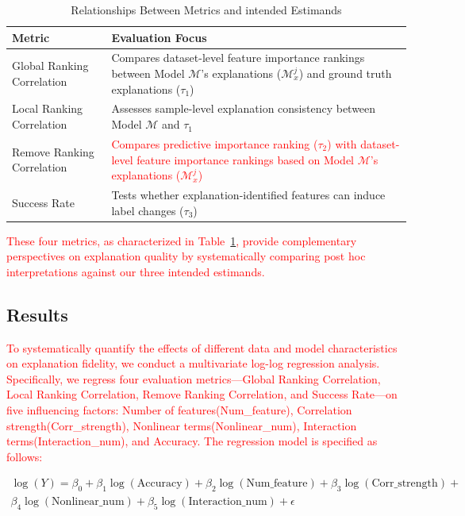 \begin{table}[htbp]
\centering
\caption{Relationships Between Metrics and intended Estimands}
\label{tab:metric_relationship}
\begin{tabular}{lp{8cm}}
\toprule
\textbf{Metric} & \textbf{Evaluation Focus} \\
\midrule
Global Ranking Correlation & Compares dataset-level feature importance rankings between Model $\mathcal{M}$'s explanations ($\mathcal{M}_x^j$) and ground truth explanations ($\tau_1$) \\
Local Ranking Correlation & Assesses sample-level explanation consistency between Model $\mathcal{M}$ and $\tau_1$ \\
Remove Ranking Correlation & \textcolor{red}{Compares predictive importance ranking ($\tau_2$) with dataset-level feature importance rankings based on Model $\mathcal{M}$’s explanations ($\mathcal{M}_x^j$) } \\
Success Rate & Tests whether explanation-identified features can induce label changes ($\tau_3$) \\
\bottomrule
\end{tabular}
\end{table}

\textcolor{red}{These four metrics, as characterized in Table~\ref{tab:metric_relationship}, provide complementary perspectives on explanation quality by systematically comparing post hoc interpretations against our three intended estimands.}

\subsection{Results}
\label{sec:nonlinear results}
\textcolor{red}{To systematically quantify the effects of different data and model characteristics on explanation fidelity, we conduct a multivariate log-log regression analysis. Specifically, we regress four evaluation metrics—Global Ranking Correlation, Local Ranking Correlation, Remove Ranking Correlation, and Success Rate—on five influencing factors: Number of features(Num\_feature), Correlation strength(Corr\_strength), Nonlinear terms(Nonlinear\_num), Interaction terms(Interaction\_num), and Accuracy. The regression model is specified as follows:}

\begin{align}
\log(Y) = \beta_0 + \beta_1 \log(\text{Accuracy}) + \beta_2 \log(\text{Num\_feature}) + \beta_3 \log(\text{Corr\_strength}) + \nonumber \\ \beta_4 \log(\text{Nonlinear\_num}) + \beta_5 \log(\text{Interaction\_num}) + \epsilon
\end{align}\nonumber


